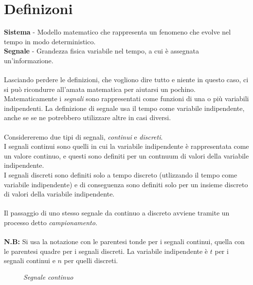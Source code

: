 \documentclass{article}
\begin{document}
    \section{Definizoni}
        \textbf{Sistema} - Modello matematico che rappresenta un fenomeno che evolve nel tempo in modo deterministico. \\
        \textbf{Segnale} - Grandezza fisica variabile nel tempo, a cui è assegnata un'informazione. \\
        \\
        Lasciando perdere le definizioni, che vogliono dire tutto e niente in questo caso, ci si può ricondurre all'amata matematica per aiutarsi un pochino. Matematicamente i \textit{segnali} sono rappresentati come funzioni di una o più variabili indipendenti. La definizione di segnale usa il tempo come variabile indipendente, anche se se ne potrebbero utilizzare altre in casi diversi. \\
        \\
        Considereremo due tipi di segnali, \textit{continui} e \textit{discreti}. \\
        I segnali continui sono quelli in cui la variabile indipendente è rappresentata come un valore continuo, e questi sono definiti per un contnuum di valori della variabile indipendente. \\
        I segnali discreti sono definiti solo a tempo discreto (utlizzando il tempo come variabile indipendente) e di conseguenza sono definiti solo per un insieme discreto di valori della variabile indipendente. \\
        \\
        Il passaggio di uno stesso segnale da continuo a discreto avviene tramite un processo detto \textit{campionamento}. \\
		\\
		\textbf{N.B:} Si usa la notazione con le parentesi tonde per i segnali continui, quella con le parentesi quadre per i segnali discreti. La variabile indipendente è $ t $ per i segnali continui e $ n $ per quelli discreti.

		\begin{figure} [h]
			\begin{center}
			\end{center}
			\captionsetup{labelformat=empty}
			\caption{\textit{Segnale continuo}}
		\end{figure}
\end{document}
